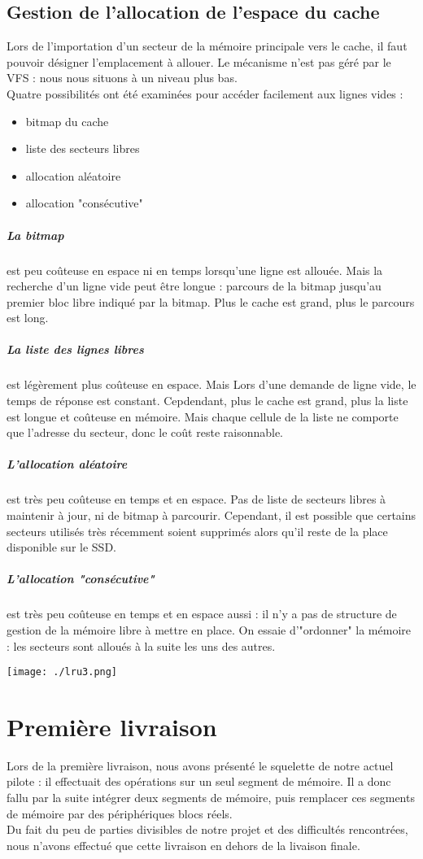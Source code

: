 \documentclass[a4paper,10pt]{article}
\begin{document}
\subsection{Gestion de l'allocation de l'espace du cache} 
Lors de l'importation d'un secteur de la mémoire principale vers le cache, il faut pouvoir désigner l'emplacement à allouer. Le mécanisme n'est pas géré par 
le VFS : nous nous situons à un niveau plus bas.\\
Quatre possibilités ont été examinées pour accéder facilement aux lignes vides : 
\begin{itemize}
 \item bitmap du cache
 \item liste des secteurs libres
 \item allocation aléatoire
 \item allocation "consécutive"
\end{itemize}
\subparagraph{La bitmap} est peu coûteuse en espace ni en temps lorsqu'une ligne est allouée. Mais la recherche d'un ligne vide peut être longue : parcours de 
la bitmap jusqu'au premier bloc libre indiqué par la bitmap. Plus le cache est grand, plus le parcours est long. 

\subparagraph{La liste des lignes libres} est légèrement plus coûteuse en espace. Mais Lors d'une demande de ligne vide, le temps de réponse est constant. 
Cepdendant, plus le cache est grand, plus la liste est longue et coûteuse en mémoire. Mais chaque cellule de la liste ne comporte que l'adresse du secteur, 
donc le coût reste raisonnable.

\subparagraph{L'allocation aléatoire} est très peu coûteuse en temps et en espace. Pas de liste de secteurs libres à maintenir à jour, ni de bitmap à 
parcourir. Cependant, il est possible que certains secteurs utilisés très récemment soient supprimés alors qu'il reste de la place disponible sur le SSD.

\subparagraph{L'allocation "consécutive"} est très peu coûteuse en temps et en espace aussi : il n'y a pas de structure de gestion de la mémoire libre à 
mettre en place. On essaie d'"ordonner" la mémoire : les secteurs sont alloués à la suite les uns des autres.
\begin{center}
 \texttt{[image: ./lru3.png]}
\end{center}

\section{Première livraison}
Lors de la première livraison, nous avons présenté le squelette de notre actuel pilote : il effectuait des opérations sur un seul segment de mémoire. Il a 
donc fallu par la suite intégrer deux segments de mémoire, puis remplacer ces segments de mémoire par des périphériques blocs réels.\medskip\\
Du fait du peu de parties divisibles de notre projet et des difficultés rencontrées, nous n'avons effectué que cette livraison en dehors de la livaison 
finale.
\end{document}
